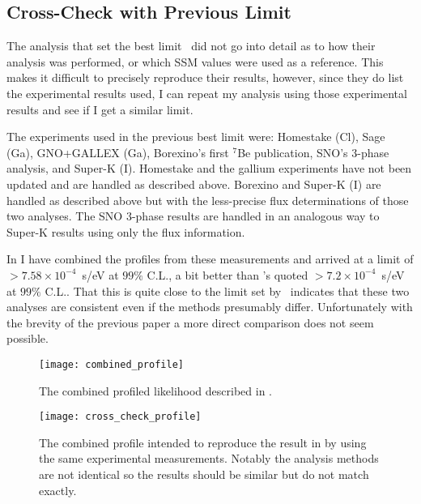 \subsection{Cross-Check with Previous Limit}

The analysis that set the best limit~\cite{picoreti} did not go into detail as to how their analysis was performed, or which SSM values were used as a reference.
This makes it difficult to precisely reproduce their results, however, since they do list the experimental results used, I can repeat my analysis using those experimental results and see if I get a similar limit.

The experiments used in the previous best limit were: Homestake (Cl), Sage (Ga), GNO+GALLEX (Ga), Borexino's first $^7$Be publication, SNO's 3-phase analysis, and Super-K (I). 
Homestake and the gallium experiments have not been updated and are handled as described above.
Borexino and Super-K (I) are handled as described above but with the less-precise flux determinations of those two analyses. 
The SNO 3-phase results are handled in an analogous way to Super-K results using only the flux information.


In  I have combined the profiles from these measurements and arrived at a limit of $>7.58\times10^{-4}$~s/eV at $99\%$ C.L., a bit better than \cite{picoreti}'s quoted $>7.2\times10^{-4}$~s/eV at $99\%$ C.L..
That this is quite close to the limit set by~\cite{picoreti} indicates that these two analyses are consistent even if the methods presumably differ.
Unfortunately with the brevity of the previous paper a more direct comparison does not seem possible.

\begin{figure}
\centering
\texttt{[image: combined\_profile]}
\caption{The combined profiled likelihood described in .}
\label{fig:combined_profile}
\end{figure}

\begin{figure}
\centering
\texttt{[image: cross\_check\_profile]}
\caption{The combined profile intended to reproduce the result in \cite{picoreti} by using the same experimental measurements. Notably the analysis methods are not identical so the results should be similar but do not match exactly.}
\label{fig:cross_check_profile}
\end{figure}
